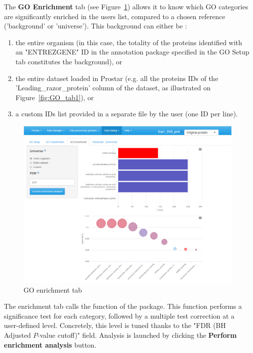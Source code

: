 \documentclass[12pt]{article}
\begin{document}
The \textbf{GO Enrichment} tab (see Figure~\ref{fig:GO_tab3}) allows it to know which
GO categories are significantly enriched in the users list, compared 
to a chosen reference ('background' or 'universe'). 
This background can either be : 
\begin{enumerate}
 \item the entire 
organism (in this case, the totality of the proteins identified with an 
"ENTREZGENE" ID in the annotation package specified in the GO Setup tab 
constitutes the background), or 
\item  the entire dataset loaded in Prostar (e.g. all the proteins IDs of the 
'Leading\_razor\_protein' column of the dataset, as illustrated on 
Figure~\ref{fig:GO_tab1}), or 
\item  a custom IDs list provided in a separate file by the user (one ID per line). 
\end{enumerate}


\begin {figure}
\includegraphics[width=\textwidth]{images/GO_tab3.png}
\caption{GO enrichment tab}\label{fig:GO_tab3}
\end {figure}

The enrichment tab calls the  function of the 
 package. This function performs a significance test
for each category, followed by a multiple test correction at a user-defined level.
Concretely, this level is tuned thanks to 
the "FDR (BH Adjusted $P$-value cutoff)" field. 
Analysis is launched by clicking the \textbf{Perform enrichment analysis} button.
\end{document}
